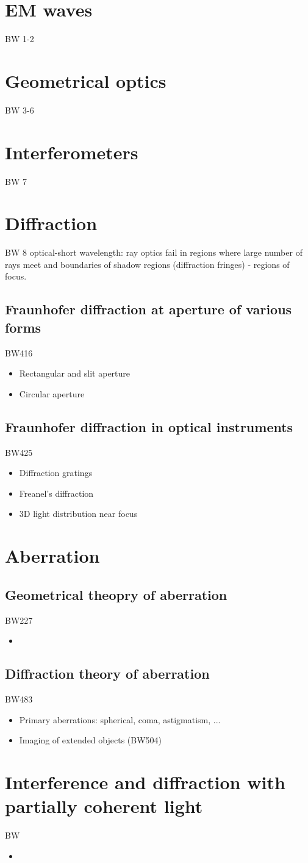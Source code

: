 \chapter{EM waves}
BW 1-2
\chapter{Geometrical optics}
BW 3-6
\chapter{Interferometers}
BW 7
\chapter{Diffraction}
BW 8
optical-short wavelength: ray optics fail in regions where large number of rays meet and boundaries of shadow regions (diffraction fringes) - regions of focus.
\section{Fraunhofer diffraction at aperture of various forms}
BW416
\begin{itemize}
\item Rectangular and slit aperture
\item Circular aperture
\end{itemize}
\section{Fraunhofer diffraction in optical instruments}
BW425
\begin{itemize}
\item Diffraction gratings
\item Freanel's diffraction
\item 3D light distribution near focus
\end{itemize}
\chapter{Aberration}
\section{Geometrical theopry of aberration}
BW227
\begin{itemize}\item \end{itemize}
\section{Diffraction theory of aberration}
BW483
\begin{itemize}
\item Primary aberrations: spherical, coma, astigmatism, ...
\item Imaging of extended objects (BW504)
\end{itemize}
\chapter{Interference and diffraction with partially coherent light}
BW
\begin{itemize}\item \end{itemize}
